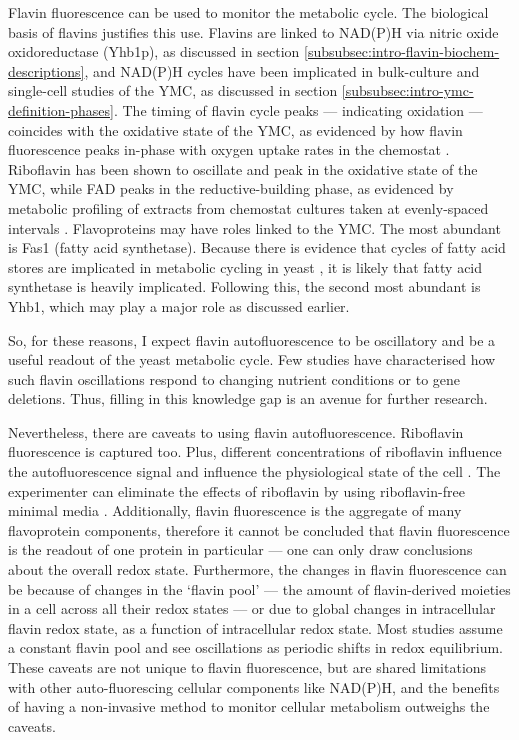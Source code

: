 Flavin fluorescence can be used to monitor the metabolic cycle.
The biological basis of flavins justifies this use.
Flavins are linked to NAD(P)H via nitric oxide oxidoreductase (Yhb1p), as discussed in section \ref{subsubsec:intro-flavin-biochem-descriptions}, and NAD(P)H cycles have been implicated in bulk-culture \citep{tuLogicYeastMetabolic2005} %
and single-cell \citep{papagiannakisAutonomousMetabolicOscillations2017} studies of the YMC, as discussed in section \ref{subsubsec:intro-ymc-definition-phases}.
The timing of flavin cycle peaks --- indicating oxidation --- coincides with the oxidative state of the YMC, as evidenced by how flavin fluorescence peaks in-phase with oxygen uptake rates in the chemostat \citep{murrayRedoxRegulationRespiring2011,sasidharanTimeStructureYeastMetabolism2012}.
Riboflavin has been shown to oscillate and peak in the oxidative state of the YMC, while FAD peaks in the reductive-building phase, as evidenced by metabolic profiling of extracts from chemostat cultures taken at evenly-spaced intervals \parencite{tuCyclicChangesMetabolic2007}.
Flavoproteins may have roles linked to the YMC.
The most abundant is Fas1 (fatty acid synthetase).
Because there is evidence that cycles of fatty acid stores are implicated in metabolic cycling in yeast \citep{campbellBuildingBlocksAre2020}, it is likely that fatty acid synthetase is heavily implicated.
Following this, the second most abundant is Yhb1, which may play a major role as discussed earlier.

So, for these reasons, I expect flavin autofluorescence to be oscillatory and be a useful readout of the yeast metabolic cycle.
Few studies have characterised how such flavin oscillations respond to changing nutrient conditions or to gene deletions.
Thus, filling in this knowledge gap is an avenue for further research.

Nevertheless, there are caveats to using flavin autofluorescence.
Riboflavin fluorescence is captured too.
Plus, different concentrations of riboflavin influence the autofluorescence signal and influence the physiological state of the cell \citep{maslankaAutofluorescenceYeastSaccharomyces2018}.
The experimenter can eliminate the effects of riboflavin by using riboflavin-free minimal media \citep{verduynEffectBenzoicAcid1992}.
Additionally, flavin fluorescence is the aggregate of many flavoprotein components, therefore it cannot be concluded that flavin fluorescence is the readout of one protein in particular --- one can only draw conclusions about the overall redox state.
Furthermore, the changes in flavin fluorescence can be because of changes in the `flavin pool' --- the amount of flavin-derived moieties in a cell across all their redox states --- or due to global changes in intracellular flavin redox state, as a function of intracellular redox state.
Most studies assume a constant flavin pool and see oscillations as periodic shifts in redox equilibrium.
These caveats are not unique to flavin fluorescence, but are shared limitations with other auto-fluorescing cellular components like NAD(P)H, and the benefits of having a non-invasive method to monitor cellular metabolism outweighs the caveats.

